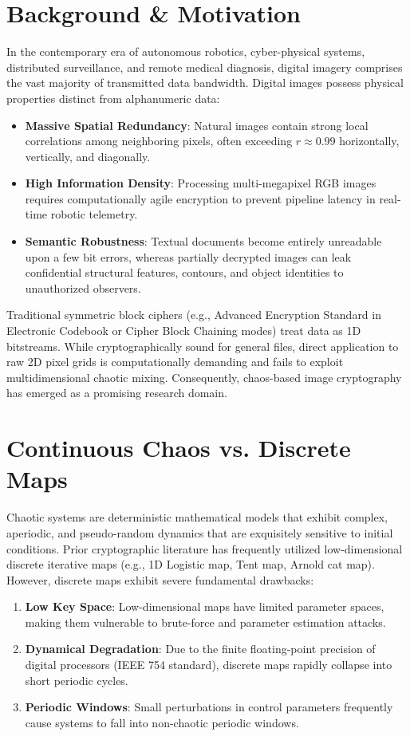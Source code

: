 \documentclass[12pt,a4paper,oneside]{report}
\begin{document}
\section{Background \& Motivation}
In the contemporary era of autonomous robotics, cyber-physical systems, distributed surveillance, and remote medical diagnosis, digital imagery comprises the vast majority of transmitted data bandwidth. Digital images possess physical properties distinct from alphanumeric data:
\begin{itemize}
    \item \textbf{Massive Spatial Redundancy}: Natural images contain strong local correlations among neighboring pixels, often exceeding $r \approx 0.99$ horizontally, vertically, and diagonally.
    \item \textbf{High Information Density}: Processing multi-megapixel RGB images requires computationally agile encryption to prevent pipeline latency in real-time robotic telemetry.
    \item \textbf{Semantic Robustness}: Textual documents become entirely unreadable upon a few bit errors, whereas partially decrypted images can leak confidential structural features, contours, and object identities to unauthorized observers.
\end{itemize}

Traditional symmetric block ciphers (e.g., Advanced Encryption Standard in Electronic Codebook or Cipher Block Chaining modes) treat data as 1D bitstreams. While cryptographically sound for general files, direct application to raw 2D pixel grids is computationally demanding and fails to exploit multidimensional chaotic mixing. Consequently, chaos-based image cryptography has emerged as a promising research domain.

\section{Continuous Chaos vs. Discrete Maps}
Chaotic systems are deterministic mathematical models that exhibit complex, aperiodic, and pseudo-random dynamics that are exquisitely sensitive to initial conditions. Prior cryptographic literature has frequently utilized low-dimensional discrete iterative maps (e.g., 1D Logistic map, Tent map, Arnold cat map). However, discrete maps exhibit severe fundamental drawbacks:
\begin{enumerate}
    \item \textbf{Low Key Space}: Low-dimensional maps have limited parameter spaces, making them vulnerable to brute-force and parameter estimation attacks.
    \item \textbf{Dynamical Degradation}: Due to the finite floating-point precision of digital processors (IEEE 754 standard), discrete maps rapidly collapse into short periodic cycles.
    \item \textbf{Periodic Windows}: Small perturbations in control parameters frequently cause systems to fall into non-chaotic periodic windows.
\end{enumerate}
\end{document}
